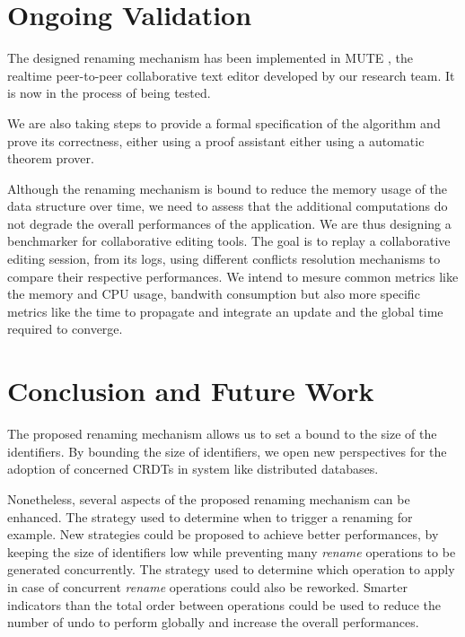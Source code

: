 \documentclass[sigplan]{acmart}
\begin{document}
\section{Ongoing Validation}

The designed renaming mechanism has been implemented in MUTE \cite{nicolas:hal-01655438}, the realtime peer-to-peer collaborative text editor developed by our research team.
It is now in the process of being tested.

We are also taking steps to provide a formal specification of the algorithm and prove its correctness, either using a proof assistant either using a automatic theorem prover.

Although the renaming mechanism is bound to reduce the memory usage of the data structure over time, we need to assess that the additional computations do not degrade the overall performances of the application.
We are thus designing a benchmarker for collaborative editing tools.
The goal is to replay a collaborative editing session, from its logs, using different conflicts resolution mechanisms to compare their respective performances.
We intend to mesure common metrics like the memory and CPU usage, bandwith consumption but also more specific metrics like the time to propagate and integrate an update and the global time required to converge.

\section{Conclusion and Future Work}

The proposed renaming mechanism allows us to set a bound to the size of the identifiers.
By bounding the size of identifiers, we open new perspectives for the adoption of concerned \acp{CRDT} in system like distributed databases.

Nonetheless, several aspects of the proposed renaming mechanism can be enhanced.
The strategy used to determine when to trigger a renaming for example.
New strategies could be proposed to achieve better performances, by keeping the size of identifiers low while preventing many \emph{rename} operations to be generated concurrently.
The strategy used to determine which operation to apply in case of concurrent \emph{rename} operations could also be reworked. Smarter indicators than the total order between operations could be used to reduce the number of undo to perform globally and increase the overall performances.



\end{document}
